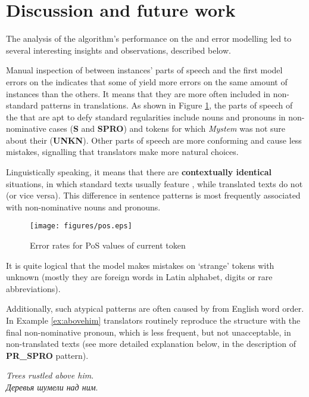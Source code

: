 \documentclass[output=paper]{langsci/langscibook.cls}
\begin{document}
\section{Discussion and future work}\label{sec:andrey:discussion}
The analysis of the algorithm's performance on the  and error modelling led to several interesting insights and observations, described below.

Manual inspection of  between instances' parts of speech and the first model errors on the  indicates that some of  yield more errors on the same amount of instances than the others. It means that they are more often included in non-standard  patterns in translations. As shown in Figure \ref{fig:pos}, the parts of speech of the  that are apt to defy standard  regularities include nouns and pronouns in non-nominative cases (\textbf{S} and \textbf{SPRO}) and tokens for which \textit{Mystem} was not sure about their  (\textbf{UNKN}). Other parts of speech are more conforming and cause less mistakes, signalling that translators make more natural choices.

Linguistically speaking, it means that there are \textbf{contextually identical} situations, in which standard  texts usually feature , while translated texts do not (or vice versa). This difference in sentence patterns is most frequently associated with non-nominative nouns and pronouns.

\begin{figure}
\caption{Error rates for PoS values of current token}
\texttt{[image: figures/pos.eps]}
\label{fig:pos}
\end{figure}

It is quite logical that the model makes mistakes on `strange' tokens with unknown  (mostly they are foreign words in Latin alphabet, digits or rare abbreviations).  

Additionally, such atypical patterns are often caused by  from English word order. In Example \ref{ex:abovehim} translators routinely reproduce the structure with the final non-nominative pronoun, which is less frequent, but not unacceptable, in non-translated  texts (see more detailed explanation below, in the description of \textbf{PR\_SPRO} pattern).

\ea
\label{ex:abovehim}
\textit{Trees rustled above him}.\\
\glt
\textit{Деревья шумели над ним}. 
\z
\end{document}
